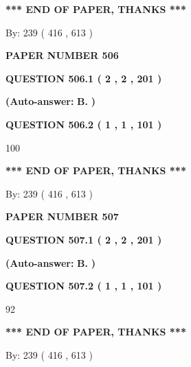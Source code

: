 \documentclass{ctexart}
\begin{document}
 
   
   
   
   
\vspace{1.0in} 
{\textbf{\large{ *** END OF PAPER, THANKS *** }}} 
   
   
\hspace{1.0in} By: 
 239 ( 416 ,  613 )
   
   
   
   
\newpage 
\setcounter{page}{ 
   506001 } 
   
   
 {\textbf{ \Large{ PAPER NUMBER  506  }}}
   
   
   
   
  
  
{\textbf{\large{QUESTION
506.1 
 ( 2 , 2 , 201 )
}}}
 
 
{\textbf{(Auto-answer:}}
{\textbf{\large{
B.}}}
{\textbf{)}}
 
 
  
  
{\textbf{\large{QUESTION
506.2 
 ( 1 , 1 , 101 )
}}}

100
   
   
   
   
\vspace{1.0in} 
{\textbf{\large{ *** END OF PAPER, THANKS *** }}} 
   
   
\hspace{1.0in} By: 
 239 ( 416 ,  613 )
   
   
   
   
\newpage 
\setcounter{page}{ 
   507001 } 
   
   
 {\textbf{ \Large{ PAPER NUMBER  507  }}}
   
   
   
   
  
  
{\textbf{\large{QUESTION
507.1 
 ( 2 , 2 , 201 )
}}}
 
 
{\textbf{(Auto-answer:}}
{\textbf{\large{
B.}}}
{\textbf{)}}
 
 
  
  
{\textbf{\large{QUESTION
507.2 
 ( 1 , 1 , 101 )
}}}

92
   
   
   
   
\vspace{1.0in} 
{\textbf{\large{ *** END OF PAPER, THANKS *** }}} 
   
   
\hspace{1.0in} By: 
 239 ( 416 ,  613 )
   
   
   
   
\newpage 
\setcounter{page}{ 
   508001 } 
   
\end{document}
